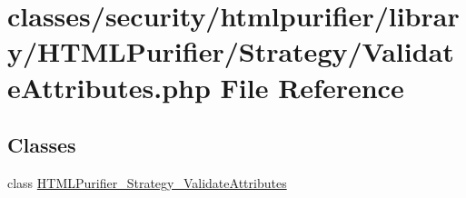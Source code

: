 \hypertarget{ValidateAttributes_8php}{\section{classes/security/htmlpurifier/library/\+H\+T\+M\+L\+Purifier/\+Strategy/\+Validate\+Attributes.php File Reference}
\label{ValidateAttributes_8php}
}
\subsection*{Classes}
\begin{DoxyCompactItemize}
\item 
class \hyperlink{classHTMLPurifier__Strategy__ValidateAttributes}{H\+T\+M\+L\+Purifier\+\_\+\+Strategy\+\_\+\+Validate\+Attributes}
\end{DoxyCompactItemize}
